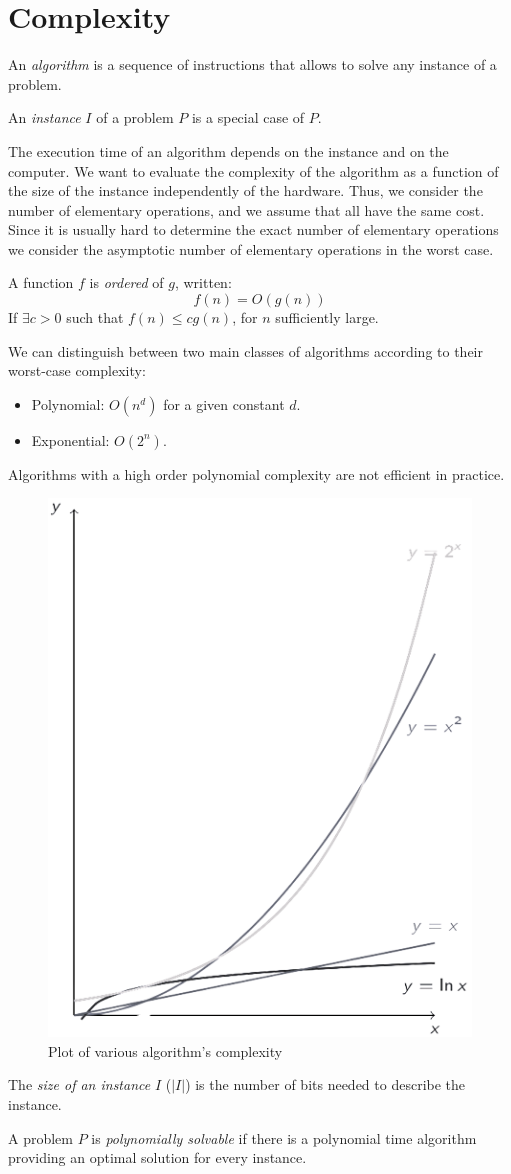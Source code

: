 \documentclass[12pt, a4paper]{report}
\begin{document}
    \section{Complexity}
    \begin{definition}
        An \emph{algorithm} is a sequence of instructions that allows to solve any instance of a problem.

        An \emph{instance} $I$ of a problem $P$ is a special case of $P$. 
    \end{definition}
    The execution time of an algorithm depends on the instance and on the computer. We want to evaluate the complexity of the algorithm as a function of the size of the instance
    independently of the hardware. Thus, we consider the number of elementary operations, and we assume that all have the same cost. Since it is usually hard to determine the exact number of
    elementary operations we consider the asymptotic number of elementary operations in the worst case.
    \begin{definition}
        A function $f$ is \emph{ordered} of $g$, written: 
        \[f(n)=O(g(n))\]
        If $\exists c > 0$ such that $f(n) \leq cg(n)$, for $n$ sufficiently large. 
    \end{definition}
    We can distinguish between two main classes of algorithms according to their worst-case complexity:
    \begin{itemize}
        \item Polynomial: $O(n^d)$ for a given constant $d$.
        \item Exponential: $O(2^n)$. 
    \end{itemize}
    Algorithms with a high order polynomial complexity are not efficient in practice.
    \begin{figure}[H]
        \centering
        \includegraphics[width=0.25\linewidth]{images/complexity.png}
        \caption{Plot of various algorithm's complexity}
    \end{figure}
    \begin{definition}
        The \emph{size of an instance} $I$ ($\left\lvert I \right\rvert$) is the number of bits needed to describe the instance. 

        A problem $P$ is \emph{polynomially solvable} if there is a polynomial time algorithm providing an optimal solution for every instance. 
    \end{definition}
\end{document}
